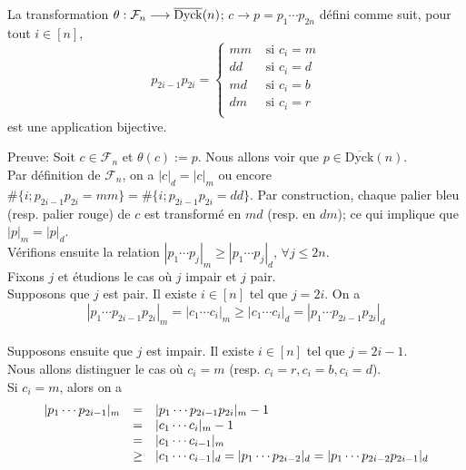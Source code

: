 \begin{proposition} \label{bij-DyckBar}
	La transformation $\theta: \mathcal{F}_{n} \longrightarrow  \overline{\rm{Dyck}}(n)$; $c \longrightarrow p=p_{1}\cdots p_{2n}$ défini comme suit, pour tout $i \in [n]$,
	$$
		p_{2i-1}p_{2i}=\begin{cases}
			mm & \text{ si } c_{i}=m \\
			dd & \text{ si } c_{i}=d \\
			md & \text{ si } c_{i}=b \\
			dm & \text{ si } c_{i}=r \\
		\end{cases}
	$$
	est une application bijective.
\end{proposition}
Preuve: Soit $c\in \mathcal{F}_{n}$ et $\theta(c):=p$.
Nous allons voir que $p\in \overline{\text{Dyck}}(n) $.\\
Par définition de $\mathcal{F}_{n}$, on a $|c|_{d}=|c|_{m}$ ou encore \\$\#\{i; p_{2i-1}p_{2i}=mm\}=\#\{i; p_{2i-1}p_{2i}=dd\}$. Par construction, chaque palier
bleu (resp. palier rouge) de $c$ est transformé en $md$ (resp. en $dm$); ce qui implique que $|p|_{m}=|p|_{d}$.\\
Vérifions ensuite la relation $|p_{1} \cdots p_{j}|_{m}\geq |p_{1} \cdots p_{j}|_{d}$, $\forall j\leq 2n$.\\
Fixons $j$ et étudions le cas où $j$ impair et $j$ pair. \\
Supposons que $j$ est pair. Il existe $i\in [n]$ tel que $j=2i$. On a \vspace{5pt}\\
\[
	|p_{1} \cdots p_{2i-1}p_{2i}|_{m} = |c_{1} \cdots c_{i}|_{m}\geq |c_{1} \cdots c_{i}|_{d} = |p_{1} \cdots p_{2i-1}p_{2i}|_{d}
\]
\text{}\vspace{5pt}\\
Supposons ensuite que $j$ est impair. Il existe $i\in [n]$ tel que $j = 2i-1$.\\ Nous allons distinguer le cas où $c_{i} = m$ (resp. $c_{i}=r, c_{i}=b, c_{i}=d$).\\
Si $c_{i}=m$, alors on a \vspace{5pt}\\
\[
	\begin{array} {l l l}
		| p_{1}\cdots p_{2i-1} |_{m} & =    & | p_{1}\cdots p_{2i-1}p_{2i} |_{m} -1                                                           \\
		                             & =    & | c_{1}\cdots c_{i} |_{m} -1                                                                    \\
		                             & =    & | c_{1}\cdots c_{i-1} |_{m}                                                                     \\
		                             & \geq & | c_{1}\cdots c_{i-1} |_{d} =| p_{1}\cdots p_{2i-2} |_{d} =| p_{1}\cdots p_{2i-2}p_{2i-1} |_{d} \\
	\end{array}
\]

